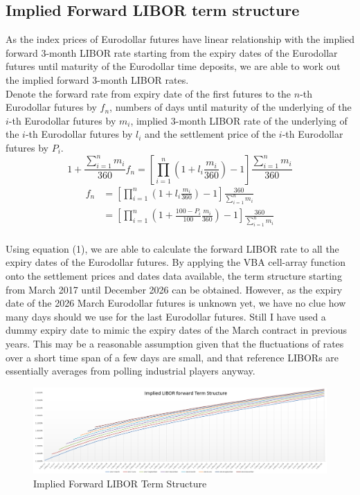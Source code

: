 \subsection{Implied Forward LIBOR term structure}
As the index prices of Eurodollar futures have linear relationship with the implied forward 3-month LIBOR rate starting from the expiry dates of the Eurodollar futures until maturity of the Eurodollar time deposits, we are able to work out the implied forward 3-month LIBOR rates.\\[4mm]
Denote the forward rate from expiry date of the first futures to the $n$-th Eurodollar futures by $f_{n}$, numbers of days until maturity of the underlying of the $i$-th Eurodollar futures by $m_{i}$, implied 3-month LIBOR rate of the underlying of the $i$-th Eurodollar futures by $l_{i}$ and the settlement price of the $i$-th Eurodollar futures by $P_{i}$.\\[4mm]
$$1 + \frac{\sum_{i=1}^{n} m_{i}}{360}f_{n} = [\prod_{i=1}^{n} (1 + l_{i}\frac{m_{i}}{360}) - 1] \frac{\sum_{i=1}^{n} m_{i}}{360}$$
\begin{equation}
\begin{split}
f_{n} &= [\prod_{i=1}^{n} (1 + l_{i}\frac{m_{i}}{360}) - 1] \frac{360}{\sum_{i=1}^{n} m_{i}}\\
&= [\prod_{i=1}^{n} (1 + \frac{100 - P_{i}}{100}\frac{m_{i}}{360}) - 1] \frac{360}{\sum_{i=1}^{n} m_{i}}
\end{split}
\end{equation}
\\[4mm]Using equation (1), we are able to calculate the forward LIBOR rate to all the expiry dates of the Eurodollar futures. By applying the VBA cell-array function onto the settlement prices and dates data available, the term structure starting from March 2017 until December 2026 can be obtained. However, as the expiry date of the 2026 March Eurodollar futures is unknown yet, we have no clue how many days should we use for the last Eurodollar futures. Still I have used a dummy expiry date to mimic the expiry dates of the March contract in previous years. This may be a reasonable assumption given that the fluctuations of rates over a short time span of a few days are small, and that reference LIBORs are essentially averages from polling industrial players anyway.
\begin{figure}[h]
	\centering
	\includegraphics[scale=0.4]{biu.PNG}
	\caption{Implied Forward LIBOR Term Structure}
\end{figure}
